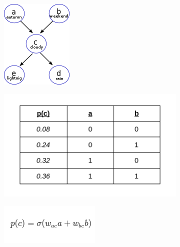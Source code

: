 \begin{figure}[h]
	\centering
	\begin{subfigure}[t]{.33\textwidth}
  		\centering
  		\includegraphics[width=.6\linewidth]{imgs/bayesnet1.png}
  		\caption{}
  		\label{fig:sub1}
	\end{subfigure}%
	\begin{subfigure}[t]{.33\textwidth}
  		\centering
  		\includegraphics[width=.9\linewidth]{imgs/bayesnet2.png}
  		\caption{}
  		\label{fig:sub2}
	\end{subfigure}
	\begin{subfigure}[t]{.33\textwidth}
  		\centering
  		\includegraphics[width=.7\linewidth]{imgs/bayesnet3.png}

\end{subfigure}
\end{figure}
